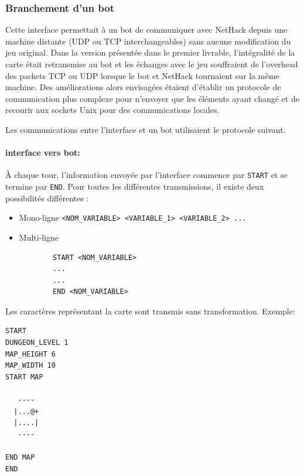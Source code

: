 \documentclass[a4paper,12pt]{article}
\begin{document}
\subsubsection*{Branchement d'un bot}

Cette interface permettait à un bot de communiquer avec NetHack depuis une machine distante (UDP ou TCP interchangeables) sans aucune modification du jeu original. Dans la version présentée dans le premier livrable, l'intégralité de la carte était retransmise au bot et les échanges avec le jeu souffraient de l'overhead des packets TCP ou UDP lorsque le bot et NetHack tournaient sur la même machine. Des améliorations alors envisagées étaient d'établir un protocole de communication plus complexe pour n'envoyer que les éléments ayant changé et de recourir aux sockets Unix pour des communications locales.

Les communications entre l'interface et un bot utilisaient le protocole suivant.

\paragraph{interface vers bot:} À chaque tour, l'information envoyée par l'interface commence par \verb!START! et se termine par \verb!END!. Pour toutes les différentes transmissions, il existe deux possibilités différentes :
\begin{itemize}
	\item Mono-ligne \verb!<NOM_VARIABLE> <VARIABLE_1> <VARIABLE_2> ...!
	\item Multi-ligne
		\begin{verbatim}
		START <NOM_VARIABLE>
		...
		...
		END <NOM_VARIABLE>
		\end{verbatim}
\end{itemize}
Les caractères représentant la carte sont transmis sans transformation. Exemple:
\begin{verbatim}
START
DUNGEON_LEVEL 1
MAP_HEIGHT 6
MAP_WIDTH 10
START MAP
          
   ----   
  |...@+  
  |....|  
   ----   
          
END MAP
END
\end{verbatim}
\end{document}
